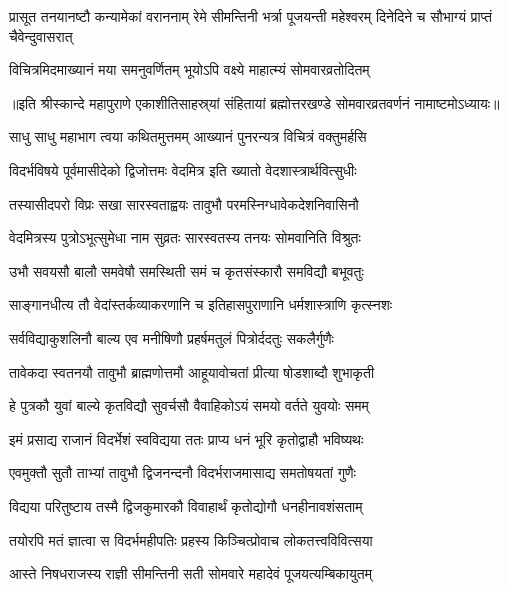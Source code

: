 \threelineshloka
{प्रासूत तनयानष्टौ कन्यामेकां वराननाम्}
{रेमे सीमन्तिनी भर्त्रा पूजयन्ती महेश्वरम्}
{दिनेदिने च सौभाग्यं प्राप्तं चैवेन्दुवासरात्} %

\twolineshloka
{विचित्रमिदमाख्यानं मया समनुवर्णितम्}
{भूयोऽपि वक्ष्ये माहात्म्यं सोमवारव्रतोदितम्} %

{॥इति श्रीस्कान्दे महापुराणे एकाशीतिसाहस्र्यां संहितायां ब्रह्मोत्तरखण्डे सोमवारव्रतवर्णनं नामाष्टमोऽध्यायः॥}



\resetShloka

\twolineshloka
{साधु साधु महाभाग त्वया कथितमुत्तमम्}
{आख्यानं पुनरन्यत्र विचित्रं वक्तुमर्हसि} %

\twolineshloka
{विदर्भविषये पूर्वमासीदेको द्विजोत्तमः}
{वेदमित्र इति ख्यातो वेदशास्त्रार्थवित्सुधीः} %

\twolineshloka
{तस्यासीदपरो विप्रः सखा सारस्वताह्वयः}
{तावुभौ परमस्निग्धावेकदेशनिवासिनौ} %

\twolineshloka
{वेदमित्रस्य पुत्रोऽभूत्सुमेधा नाम सुव्रतः}
{सारस्वतस्य तनयः सोमवानिति विश्रुतः} %

\twolineshloka
{उभौ सवयसौ बालौ समवेषौ समस्थिती}
{समं च कृतसंस्कारौ समविद्यौ बभूवतुः} %

\twolineshloka
{साङ्गानधीत्य तौ वेदांस्तर्कव्याकरणानि च}
{इतिहासपुराणानि धर्मशास्त्राणि कृत्स्नशः} %

\twolineshloka
{सर्वविद्याकुशलिनौ बाल्य एव मनीषिणौ}
{प्रहर्षमतुलं पित्रोर्ददतुः सकलैर्गुणैः} %

\twolineshloka
{तावेकदा स्वतनयौ तावुभौ ब्राह्मणोत्तमौ}
{आहूयावोचतां प्रीत्या षोडशाब्दौ शुभाकृती} %

\twolineshloka
{हे पुत्रकौ युवां बाल्ये कृतविद्यौ सुवर्चसौ}
{वैवाहिकोऽयं समयो वर्तते युवयोः समम्} %

\twolineshloka
{इमं प्रसाद्य राजानं विदर्भेशं स्वविद्यया}
{ततः प्राप्य धनं भूरि कृतोद्वाहौ भविष्यथः} %

\twolineshloka
{एवमुक्तौ सुतौ ताभ्यां तावुभौ द्विजनन्दनौ}
{विदर्भराजमासाद्य समतोषयतां गुणैः} %

\twolineshloka
{विद्यया परितुष्टाय तस्मै द्विजकुमारकौ}
{विवाहार्थं कृतोद्योगौ धनहीनावशंसताम्} %

\twolineshloka
{तयोरपि मतं ज्ञात्वा स विदर्भमहीपतिः}
{प्रहस्य किञ्चित्प्रोवाच लोकतत्त्वविवित्सया} %

\twolineshloka
{आस्ते निषधराजस्य राज्ञी सीमन्तिनी सती}
{सोमवारे महादेवं पूजयत्यम्बिकायुतम्} %

